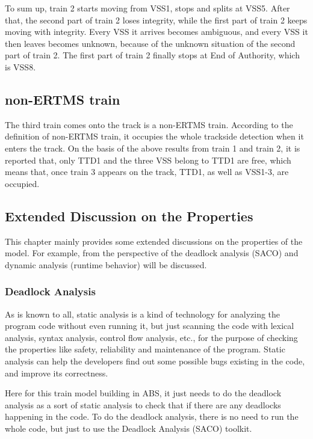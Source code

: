 \documentclass[article,dr=phil,type=msc,colorback,accentcolor=tud9c]{tudthesis}
\begin{document}
	To sum up, train 2 starts moving from VSS1, stops and splits at VSS5. After that, the second part of train 2 loses integrity, while the first part of train 2 keeps moving with integrity. Every VSS it arrives becomes ambiguous, and every VSS it then leaves becomes unknown, because of the unknown situation of the second part of train 2. The first part of train 2 finally stops at End of Authority, which is VSS8.  
  
  \subsection{non-ERTMS train}
  
  The third train comes onto the track is a non-ERTMS train. According to the definition of non-ERTMS train, it occupies the whole trackside detection when it enters the track. On the basis of the above results from train 1 and train 2, it is reported that, only TTD1 and the three VSS belong to TTD1 are free, which means that, once train 3 appears on the track, TTD1, as well as VSS1-3, are occupied.
  
  \subsection{Extended Discussion on the Properties}
  
  This chapter mainly provides some extended discussions on the properties of the model. For example, from the perspective of the deadlock analysis (SACO) and dynamic analysis (runtime behavior) will be discussed.
  
  \subsubsection{Deadlock Analysis}
  
  As is known to all, static analysis is a kind of technology for analyzing the program code without even running it, but just scanning the code with lexical analysis, syntax analysis, control flow analysis, etc., for the purpose of checking the properties like safety, reliability and maintenance of the program. Static analysis can help the developers find out some possible bugs existing in the code, and improve its correctness.
  
  Here for this train model building in ABS, it just needs to do the deadlock analysis as a sort of static analysis to check that if there are any deadlocks happening in the code. To do the deadlock analysis, there is no need to run the whole code, but just to use the Deadlock Analysis (SACO) toolkit. \cite{abstools}
  
\end{document}
